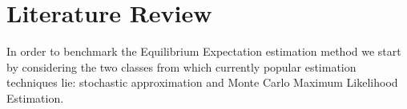 \section{Literature Review}  

In order to benchmark the Equilibrium Expectation estimation method we start by considering the two classes from which currently popular estimation techniques lie: stochastic approximation and Monte Carlo Maximum Likelihood Estimation.